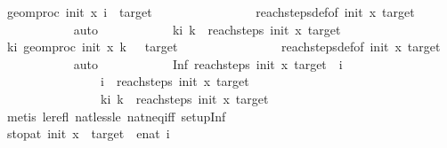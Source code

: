 \begin{isabellebody}
\ {\isacartoucheopen}geom{\isacharunderscore}{\kern0pt}proc\ init\ x\ i\ {\isacharequal}{\kern0pt}\ target{\isacartoucheclose}\isanewline
\ \ \ \ \ \ \ \ \ \ \ \ \ \ \ \ reach{\isacharunderscore}{\kern0pt}steps{\isacharunderscore}{\kern0pt}def{\isacharbrackleft}{\kern0pt}of\ init\ x\ target{\isacharbrackright}{\kern0pt}\isanewline
\ \ \ \ \ \ \ \ \ \ \isamarkupfalse%
\ auto\isanewline
\ \ \ \ \ \ \ \ \isamarkupfalse%
\ \isamarkupfalse%
\ {\isachardoublequoteopen}{\isasymforall}k{\isacharless}{\kern0pt}i{\isachardot}{\kern0pt}\ k\ {\isasymnotin}\ reach{\isacharunderscore}{\kern0pt}steps\ init\ x\ target{\isachardoublequoteclose}\isanewline
\ \ \ \ \ \ \ \ \ \ \isamarkupfalse%
\ {\isacartoucheopen}{\isasymforall}k{\isacharless}{\kern0pt}i{\isachardot}{\kern0pt}\ geom{\isacharunderscore}{\kern0pt}proc\ init\ x\ k\ {\isasymnotin}\ {\isacharbraceleft}{\kern0pt}{}{\isacharcomma}{\kern0pt}\ target{\isacharbraceright}{\kern0pt}{\isacartoucheclose}\isanewline
\ \ \ \ \ \ \ \ \ \ \ \ \ \ \ \ reach{\isacharunderscore}{\kern0pt}steps{\isacharunderscore}{\kern0pt}def{\isacharbrackleft}{\kern0pt}of\ init\ x\ target{\isacharbrackright}{\kern0pt}\isanewline
\ \ \ \ \ \ \ \ \ \ \isamarkupfalse%
\ auto\isanewline
\ \ \ \ \ \ \ \ \isamarkupfalse%
\ \isamarkupfalse%
\ {\isachardoublequoteopen}Inf\ {\isacharparenleft}{\kern0pt}reach{\isacharunderscore}{\kern0pt}steps\ init\ x\ target{\isacharparenright}{\kern0pt}\ {\isacharequal}{\kern0pt}\ i{\isachardoublequoteclose}\isanewline
\ \ \ \ \ \ \ \ \ \ \isamarkupfalse%
\ \ \isanewline
\ \ \ \ \ \ \ \ \ \ \ \ \ \ \ \ {\isacartoucheopen}i\ {\isasymin}\ reach{\isacharunderscore}{\kern0pt}steps\ init\ x\ target{\isacartoucheclose}\isanewline
\ \ \ \ \ \ \ \ \ \ \ \ \ \ \ \ {\isacartoucheopen}{\isasymforall}k{\isacharless}{\kern0pt}i{\isachardot}{\kern0pt}\ k\ {\isasymnotin}\ reach{\isacharunderscore}{\kern0pt}steps\ init\ x\ target{\isacartoucheclose}\isanewline
\ \ \ \ \ \ \ \ \ \ \isamarkupfalse%
\ {\isacharparenleft}{\kern0pt}metis\ le{\isacharunderscore}{\kern0pt}refl\ nat{\isacharunderscore}{\kern0pt}less{\isacharunderscore}{\kern0pt}le\ nat{\isacharunderscore}{\kern0pt}neq{\isacharunderscore}{\kern0pt}iff\ set{\isacharunderscore}{\kern0pt}up{\isacharunderscore}{\kern0pt}Inf{\isacharparenright}{\kern0pt}\isanewline
\ \ \ \ \ \ \ \ \isamarkupfalse%
\ \isamarkupfalse%
\ {\isachardoublequoteopen}stop{\isacharunderscore}{\kern0pt}at\ {\isacharparenleft}{\kern0pt}init{\isacharparenright}{\kern0pt}\ x\ {\isacharparenleft}{\kern0pt}\ target{\isacharparenright}{\kern0pt}\ {\isacharequal}{\kern0pt}\ enat\ i{\isachardoublequoteclose}\isanewline

\end{isabellebody}
